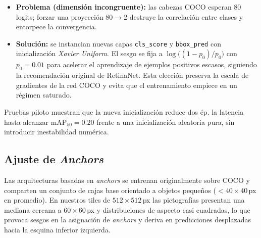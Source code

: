 \begin{itemize}
   \item \textbf{Problema (dimensión incongruente):} las cabezas COCO esperan 80 logits; forzar una proyección \(80\!\rightarrow\!2\) destruye la correlación entre clases y entorpece la convergencia.
   \item \textbf{Solución:} se instancian nuevas capas \texttt{cls\_score} y \texttt{bbox\_pred} con inicialización \emph{Xavier Uniform}.
         El sesgo se fija a \(\log\!\bigl((1-p_0)/p_0\bigr)\) con \(p_0=0.01\) para acelerar el aprendizaje de ejemplos positivos escasos, siguiendo la recomendación original de RetinaNet.
         Esta elección preserva la escala de gradientes de la red COCO y evita que el entrenamiento empiece en un régimen saturado.
\end{itemize}

Pruebas piloto muestran que la nueva inicialización reduce dos ép. la latencia hasta alcanzar \(\text{mAP}_{50}=0.20\) frente a una inicialización aleatoria pura, sin introducir inestabilidad numérica.

\subsection{Ajuste de \emph{Anchors}}\label{ssec:anchors}

Las arquitecturas basadas en \emph{anchors} se entrenan originalmente sobre COCO y comparten un conjunto de cajas base orientado a objetos pequeños (\(<\!40\times40\)\,px en promedio).
En nuestros tiles de \(512\times512\)\,px las pictografías presentan una mediana cercana a \(60\times60\)\,px y distribuciones de aspecto casi cuadradas, lo que provoca sesgos en la asignación de \emph{anchors} y deriva en predicciones desplazadas hacia la esquina inferior izquierda.

